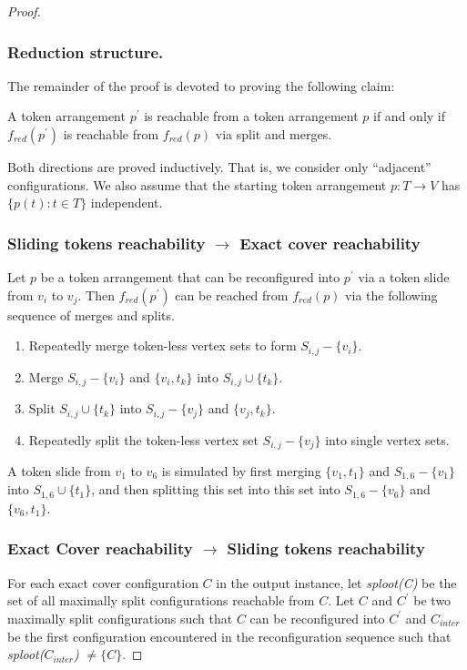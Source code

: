 \begin{proof}
\subsubsection{Reduction structure.}
The remainder of the proof is devoted to proving the following claim:
\begin{claim} A token arrangement $p^{'}$ is reachable from a token arrangement $p$ if and only if $f_{red}(p^{'})$ is reachable from
$f_{red}(p)$ via split and merges.
\end{claim}
Both directions are proved inductively. That is, we consider only “adjacent” configurations. We also assume that the starting token
arrangement $p : T \rightarrow V$ has $ \{p(t) : t \in T \}$ independent.

\subsubsection{Sliding tokens reachability  $\rightarrow$ Exact cover reachability}
Let $p$ be a token arrangement that can be reconfigured into $p^{'}$ via a token slide from $v_i$ to $v_j$. Then $f_{red}(p^{'})$ can be reached
from $f_{red}(p)$ via the following sequence of merges and splits.
\begin{enumerate}
  \item Repeatedly merge token-less vertex sets to form $S_{i,j}-\{v_i\}$.
  \item Merge $S_{i,j} - \{v_i\}$ and $\{v_i, t_k\}$ into $S_{i,j} \cup \{t_k\}$.
  \item Split $S_{i,j} \cup \{t_k\}$ into $S_{i,j} - \{v_j\}$ and $\{v_j, t_k\}$.
  \item Repeatedly split the token-less vertex set $S_{i,j}-\{v_j\}$ into single vertex sets.
\end{enumerate}

\begin{example}A token slide from $v_1$ to $v_6$ is simulated by first merging $\{v_1, t_1\}$ and $S_{1,6} - \{v_1\}$ into $S_{1,6} \cup \{t_1\}$,
and then splitting this set into this set into $S_{1,6} - \{v_6\}$ and $\{v_6, t_1\}$.
\end{example}

\subsubsection{Exact Cover reachability $\rightarrow$ Sliding tokens reachability}\label{subsubsection:backward}

For each exact cover configuration $C$ in the output instance, let \textit{sploot(C)} be the set of all maximally split configurations reachable
from $C$. Let $C$ and $C^{'}$ be two maximally split configurations such that $C$ can be reconfigured into $C^{'}$ and $C_{inter}$ be the first
configuration encountered in the reconfiguration sequence such that \textit{sploot($C_{inter}$)} $\neq \{C\}$.


\end{proof}

